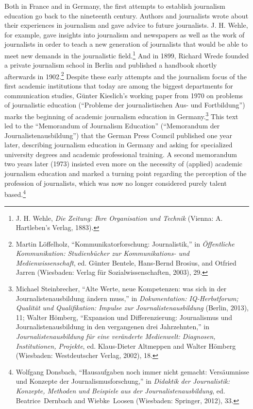 \documentclass{tufte-handout}
\begin{document}
Both in France and in Germany, the first attempts to establish
journalism education go back to the nineteenth century. Authors and
journalists wrote about their experiences in journalism and gave advice
to future journalists. J. H. Wehle, for example, gave insights into
journalism and newspapers as well as the work of journalists in order to
teach a new generation of journalists that would be able to meet new
demands in the journalistic field.\footnote{J. H. Wehle, \emph{Die
  Zeitung: Ihre Organisation und Technik} (Vienna: A. Hartleben's
  Verlag, 1883).} And in 1899, Richard Wrede founded a private
journalism school in Berlin and published a handbook shortly afterwards
in 1902.\footnote{Martin Löffelholz, ``Kommunikatorforschung:
  Journalistik,'' in \emph{Öffentliche Kommunikation: Studienbücher zur
  Kommunikations- und Medienwissenschaft}, ed. Günter Bentele,
  Hans-Bernd Brosius, and Otfried Jarren (Wiesbaden: Verlag für
  Sozialwissenschaften, 2003), 29.} Despite these early attempts and the
journalism focus of the first academic institutions that today are among
the biggest departments for communication studies, Günter Kieslich's
working paper from 1970 on problems of journalistic education
(``Probleme der journalistischen Aus- und Fortbildung'') marks the
beginning of academic journalism education in Germany.\footnote{Michael
  Steinbrecher, ``Alte Werte, neue Kompetenzen: was sich in der
  Journalistenausbildung ändern muss,'' in \emph{Dokumentation:
  IQ-Herbstforum; Qualität und Qualifikation: Impulse zur
  Journalistenausbildung} (Berlin, 2013), 11; Walter Hömberg,
  ``Expansion und Differenzierung: Journalismus und
  Journalistenausbildung in den vergangenen drei Jahrzehnten,'' in
  \emph{Journalistenausbildung für eine veränderte Medienwelt:
  Diagnosen, Institutionen, Projekte}, ed. Klaus-Dieter Altmeppen and
  Walter Hömberg (Wiesbaden: Westdeutscher Verlag, 2002), 18.} This text
led to the ``Memorandum of Journalism Education'' (``Memorandum der
Journalistenausbildung'') that the German Press Council published one
year later, describing journalism education in Germany and asking for
specialized university degrees and academic professional training. A
second memorandum two years later (1973) insisted even more on the
necessity of (applied) academic journalism education and marked a
turning point regarding the perception of the profession of journalists,
which was now no longer considered purely talent based.\footnote{Wolfgang
  Donsbach, ``Hausaufgaben noch immer nicht gemacht: Versäumnisse und
  Konzepte der Journalismusforschung,'' in \emph{Didaktik der
  Journalistik: Konzepte, Methoden und Beispiele aus der
  Journalistenausbildung}, ed. Beatrice~Dernbach and Wiebke~Loosen
  (Wiesbaden: Springer, 2012), 33.}
\end{document}
